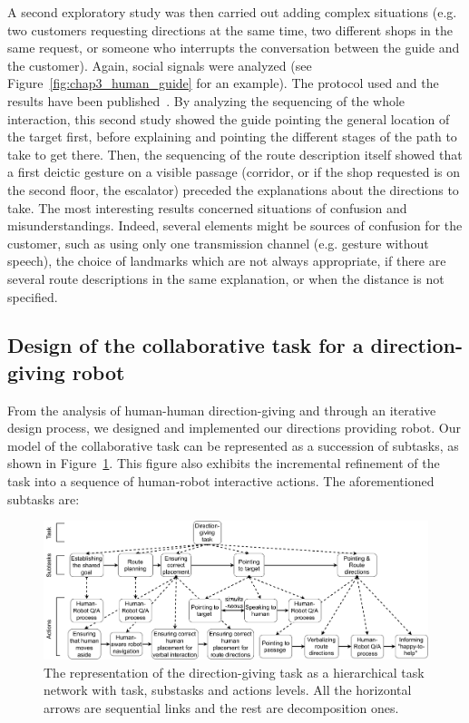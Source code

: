 \documentclass[a4paper,11pt,twoside]{StyleThese}
\begin{document}
A second exploratory study was then carried out adding complex situations (e.g. two customers requesting directions at the same time, two different shops in the same request, or someone who interrupts the conversation between the guide and the customer). Again, social signals were analyzed (see Figure~\ref{fig:chap3_human_guide} for an example). The protocol used and the results have been published~\cite{heikkilae_2018_where,heikkilae_2019_should}. By analyzing the sequencing of the whole interaction, this second study showed the guide pointing the general location of the target first, before explaining and pointing the different stages of the path to take to get there. Then, the sequencing of the route description itself showed that a first deictic gesture on a visible passage (corridor, or if the shop requested is on the second floor, the escalator) preceded the explanations about the directions to take. The most interesting results concerned situations of confusion and misunderstandings. Indeed, several elements might be sources of confusion for the customer, such as using only one transmission channel (e.g. gesture without speech), the choice of landmarks which are not always appropriate, if there are several route descriptions in the same explanation, or when the distance is not specified. 

\subsection{Design of the collaborative task for a direction-giving robot}\label{sec:guiding}

From the analysis of human-human direction-giving and through an iterative design process, we designed and implemented our directions providing robot. Our model of the collaborative task can be represented as a succession of subtasks, as shown in Figure~\ref{fig:chap3_HTN}. This figure also exhibits the incremental refinement of the task into a sequence of human-robot interactive actions. The aforementioned subtasks are:

\begin{figure}[!t]
	\centering
	\includegraphics[width=\linewidth]{figures/chapter3/HTN-guiding_task.pdf}
	\caption{The representation of the direction-giving task as a hierarchical task network with task, substasks and actions levels. All the horizontal arrows are sequential links and the rest are decomposition ones.}
	\label{fig:chap3_HTN}
\end{figure}
\end{document}
